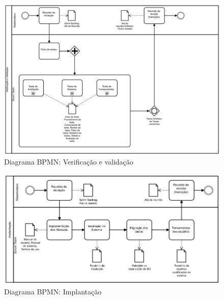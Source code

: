 \documentclass[	DIV=calc,%
							paper=a4,%
							fontsize=12pt,%
							onecolumn]{scrartcl}%
\begin{document}
\begin{figure}
\centering
\includegraphics[width=\textwidth]{verificacao.png}
\caption{Diagrama BPMN: Verificação e validação}
\label{verificacao}
\end{figure}
\FloatBarrier

\begin{figure}
\centering
\includegraphics[width=\textwidth]{implantacaoo.png}
\caption{Diagrama BPMN: Implantação}
\label{implantacacao}
\end{figure}
\end{document}
